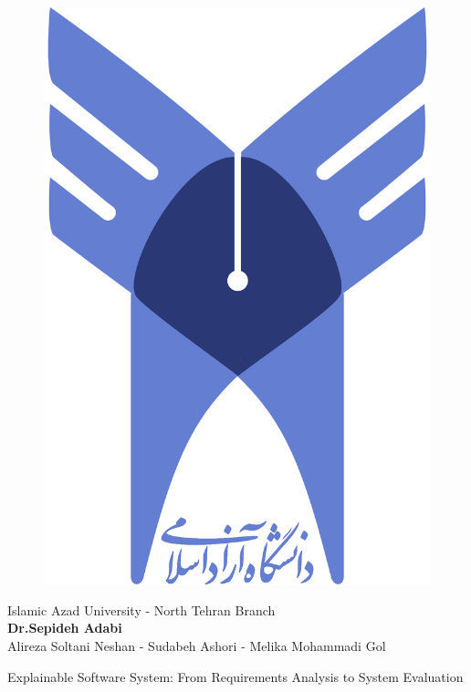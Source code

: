 \documentclass[10pt, a4paper]{beamer}
\begin{document}
\begin{frame}
    \centering
\begin{LTR}
        \centering
        \begin{figure}
            \includegraphics[scale=0.19]{images/iau_logo.png}
        \end{figure}

        \footnotesize{Islamic Azad University - North Tehran Branch} \\
        \textbf{\footnotesize Dr.Sepideh Adabi} \\
        \small{
            Alireza Soltani Neshan - 
            Sudabeh Ashori - 
            Melika Mohammadi Gol \\
        }
        \vspace{0.3in}

        \large{Explainable Software System: From Requirements Analysis to System
        Evaluation} \\
    \end{LTR}
\end{frame}
\end{document}
